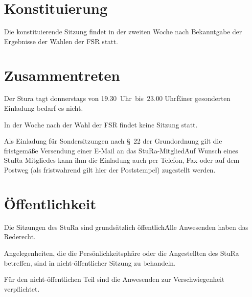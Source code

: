 


\setcounter{section}{0} %

\begin{multicols}{2}

\section{Konstituierung}

\Abs \Satz Die konstituierende Sitzung findet in der zweiten Woche nach Bekanntgabe der Ergebnisse der Wahlen der FSR statt.



\section{Zusammentreten}

\Abs \Satz Der Stura tagt donnerstags von 19.30~Uhr~bis~23.00 Uhr\. Einer gesonderten Einladung bedarf es nicht.

\Abs \Satz In der Woche nach der Wahl der FSR findet keine Sitzung statt.

\Abs \Satz Als Einladung für Sondersitzungen nach §~22 der Grundordnung gilt die fristgemäße Versendung einer E-Mail an das StuRa-Mitglied\. Auf Wunsch eines StuRa-Mitgliedes kann ihm die Einladung auch per Telefon, Fax oder auf dem Postweg (als fristwahrend gilt hier der Poststempel) zugestellt werden.



\section{Öffentlichkeit}

\Abs \Satz Die Sitzungen des StuRa sind grundsätzlich öffentlich\. Alle Anwesenden haben das Rederecht.

\Abs \Satz Angelegenheiten, die die Persönlichkeitsphäre oder die Angestellten des StuRa betreffen, sind in nicht-öffentlicher Sitzung zu behandeln.

\Abs \Satz Für den nicht-öffentlichen Teil sind die Anwesenden zur Verschwiegenheit verpflichtet.




\end{multicols}
